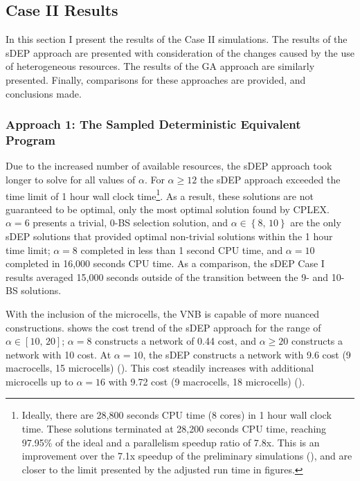 \documentclass[12pt,dvipsnames]{report}
\begin{document}
\subsection{Case II Results} \label{subsec:caseII_results}

In this section I present the results of the Case II simulations.  The results of the sDEP approach are presented with consideration of the changes caused by the use of heterogeneous resources.  The results of the GA approach are similarly presented.  Finally, comparisons for these approaches are provided, and conclusions made.

\subsubsection{Approach 1: The Sampled Deterministic Equivalent Program}

Due to the increased number of available resources, the sDEP approach took longer to solve for all values of $\alpha$.  For $\alpha \geq 12$ the sDEP approach exceeded the time limit of 1 hour wall clock time\footnote{Ideally, there are 28,800 seconds CPU time (8 cores) in 1 hour wall clock time.  These solutions terminated at 28,200 seconds CPU time, reaching 97.95\% of the ideal and a parallelism speedup ratio of 7.8x.  This is an improvement over the 7.1x speedup of the preliminary simulations (), and are closer to the limit presented by the  adjusted run time in figures.}.  As a result, these solutions are not guaranteed to be optimal, only the most optimal solution found by CPLEX.  $\alpha = 6$ presents a trivial, 0-BS selection solution, and $\alpha \in \left\{ 8,\, 10 \right\}$ are the only sDEP solutions that provided optimal non-trivial solutions within the 1 hour time limit; $\alpha = 8$ completed in less than 1 second CPU time, and $\alpha = 10$ completed in 16,000 seconds CPU time.  As a comparison, the sDEP Case I results averaged 15,000 seconds outside of the transition between the 9- and 10-BS solutions.

With the inclusion of the microcells, the VNB is capable of more nuanced constructions.   shows the cost trend of the sDEP approach for the range of $\alpha \in \left[ 10,\, 20 \right]$; $\alpha = 8$ constructs a network of 0.44 cost, and $\alpha \geq 20$ constructs a network with 10 cost.  At $\alpha = 10$, the sDEP constructs a network with 9.6 cost (9 macrocells, 15 microcells) ().  This cost steadily increases with additional microcells up to $\alpha = 16$ with 9.72 cost (9 macrocells, 18 microcells) ().
\end{document}
